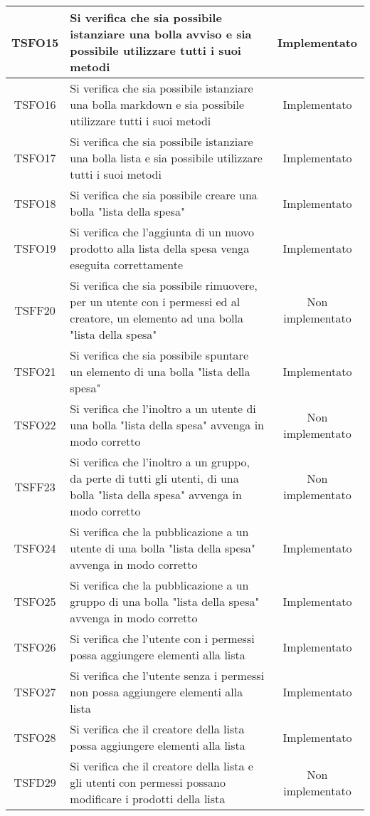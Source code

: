 \begin{center}
\begin{longtable}{|c|>{\centering}m{10cm}|c|}
		TSFO15 & Si verifica che sia possibile istanziare una bolla avviso e sia possibile utilizzare tutti i suoi metodi & Implementato \\ \hline
		TSFO16 & Si verifica che sia possibile istanziare una bolla markdown e sia possibile utilizzare tutti i suoi metodi & Implementato \\ \hline
		TSFO17 & Si verifica che sia possibile istanziare una bolla lista e sia possibile utilizzare tutti i suoi metodi & Implementato \\ \hline
		TSFO18 & Si verifica che sia possibile creare una bolla "lista della spesa" & Implementato \\ \hline
		TSFO19 & Si verifica che l'aggiunta di un nuovo prodotto alla lista della spesa venga eseguita correttamente & Implementato \\ \hline
		TSFF20 & Si verifica che sia possibile rimuovere, per un utente con i permessi ed al creatore, un elemento ad una bolla "lista della spesa" & Non implementato \\ \hline
		TSFO21 & Si verifica che sia possibile spuntare un elemento di una bolla "lista della spesa" & Implementato \\ \hline
		TSFO22 & Si verifica che l'inoltro a un utente di una bolla "lista della spesa" avvenga in modo corretto & Non implementato \\ \hline
		TSFF23 & Si verifica che l'inoltro a un gruppo, da perte di tutti gli utenti, di una bolla "lista della spesa" avvenga in modo corretto & Non implementato \\ \hline
		TSFO24 & Si verifica che la pubblicazione a un utente di una bolla "lista della spesa" avvenga in modo corretto & Implementato \\ \hline
		TSFO25 & Si verifica che la pubblicazione a un gruppo di una bolla "lista della spesa" avvenga in modo corretto & Implementato \\ \hline
		TSFO26 & Si verifica che l'utente con i permessi possa aggiungere elementi alla lista & Implementato \\ \hline
		TSFO27 & Si verifica che l'utente senza i permessi non possa aggiungere elementi alla lista & Implementato \\ \hline
		TSFO28 & Si verifica che il creatore della lista possa aggiungere elementi alla lista & Implementato \\ \hline
		TSFD29 & Si verifica che il creatore della lista e gli utenti con permessi possano modificare i prodotti della lista & Non implementato \\ \hline
	\end{longtable}
\end{center}
